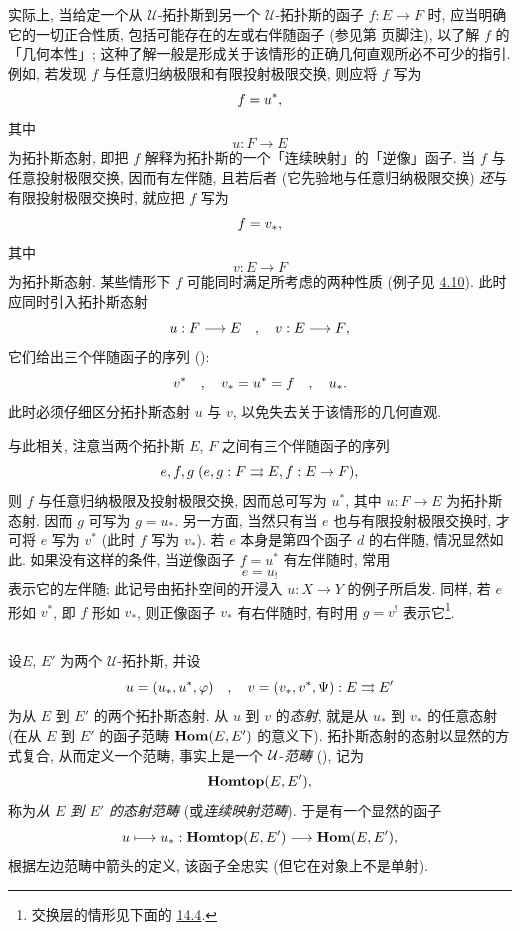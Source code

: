 \subsubsection{}
实际上, 当给定一个从 $𝒰$-拓扑斯到另一个 $𝒰$-拓扑斯的函子 $f:E\rightarrow F$ 时, 应当明确它的一切正合性质, 包括可能存在的左或右伴随函子 (参见第 \pageref{sga4[1]} 页脚注), 以了解 $f$ 的「几何本性」; 这种了解一般是形成关于该情形的正确几何直观所必不可少的指引. 例如, 若发现 $f$ 与任意归纳极限和有限投射极限交换, 则应将 $f$ 写为
$$
f=u^{\ast}{},
$$
其中
$$
u:F\longrightarrow E
$$
为拓扑斯态射, 即把 $f$ 解释为拓扑斯的一个「连续映射」的「逆像」函子. 当 $f$ 与任意投射极限交换, 因而有左伴随, 且若后者 (它先验地与任意归纳极限交换) \emph{还}与有限投射极限交换时, 就应把 $f$ 写为
$$
f=v_{\ast}{},
$$
其中
$$
v:E\longrightarrow F
$$
为拓扑斯态射. 某些情形下 $f$ 可能同时满足\pageoriginale 所考虑的两种性质 (例子见 \hyperref[IV.subsec4.10]{4.10}). 此时应同时引入拓扑斯态射
$$
u:F\longrightarrow E \quad,\quad v:E\longrightarrow F{},
$$
它们给出三个伴随函子的序列 ():
$$
v^{\ast} \quad,\quad v_{\ast}=u^{\ast}=f\quad,\quad u_{\ast}{}.
$$
此时必须仔细区分拓扑斯态射 $u$ 与 $v$, 以免失去关于该情形的几何直观.

与此相关, 注意当两个拓扑斯 $E$, $F$ 之间有三个伴随函子的序列
$$
e, f, g\; (e,g: F\rightrightarrows E, f:E\rightarrow F){},
$$
则 $f$ 与任意归纳极限及投射极限交换, 因而总可写为 $u^{\ast}$, 其中 $u:F\rightarrow E$ 为拓扑斯态射. 因而 $g$ 可写为 $g=u_{\ast}$. 另一方面, 当然只有当 $e$ 也与有限投射极限交换时, 才可将 $e$ 写为 $v^{\ast}$ (此时 $f$ 写为 $v_{\ast}$). 若 $e$ 本身是第四个函子 $d$ 的右伴随, 情况显然如此. 如果没有这样的条件, 当逆像函子 $f=u^{\ast}$ 有左伴随时, 常用
$$
e=u_{!}
$$
表示它的左伴随; 此记号由拓扑空间的开浸入 $u:X\rightarrow Y$ 的例子所启发. 同样, 若 $e$ 形如 $v^{\ast}$, 即 $f$ 形如 $v_{\ast}$, 则正像函子 $v_{\ast}$ 有右伴随时, 有时用 $g=v^{!}$ 表示它\footnote[1]{交换层的情形见下面的 \hyperref[IV.subsec14.4]{14.4}.}.

\subsection{}
设\pageoriginale $E$, $E'$ 为两个 $𝒰$-拓扑斯, 并设
$$
u=(u_{\ast},u^{\ast},\varphi)\quad,\quad
v=(v_{\ast},v^{\ast},\Psi):E\rightrightarrows E'
$$
为从 $E$ 到 $E'$ 的两个拓扑斯态射. 从 $u$ 到 $v$ 的\emph{态射}, 就是从 $u_{\ast}$ 到 $v_{\ast}$ 的任意态射 (在从 $E$ 到 $E'$ 的函子范畴 $\operatorname{\mathbf{Hom}}(E,E')$ 的意义下). 拓扑斯态射的态射以显然的方式复合, 从而定义一个范畴, 事实上是一个 $\protect\mathcal{\mathcal{U}}$-\emph{范畴} (), 记为
$$
\operatorname{\mathbf{Homtop}}(E,E'){},
$$
称为\emph{从 $E$ 到 $E'$ 的态射范畴} (或\emph{连续映射范畴}). 于是有一个显然的函子
$$
u\longmapsto u_{\ast}:\operatorname{\mathbf{Homtop}}(E,E')\longrightarrow
\operatorname{\mathbf{Hom}}(E,E'){},
$$
根据左边范畴中箭头的定义, 该函子全忠实 (但它在对象上不是单射).

